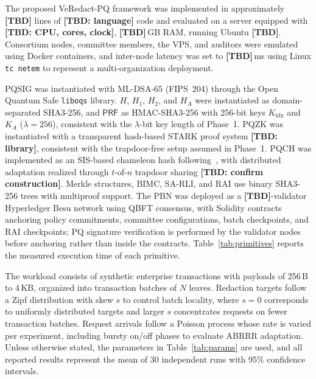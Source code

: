 \documentclass[lettersize,journal]{IEEEtran}
\begin{document}
    The proposed VeRedact-PQ framework was implemented in approximately
    \textbf{[TBD]} lines of \textbf{[TBD: language]} code and evaluated on a
    server equipped with \textbf{[TBD: CPU, cores, clock]},
    \textbf{[TBD]}\,GB RAM, running Ubuntu \textbf{[TBD]}. Consortium nodes,
    committee members, the VPS, and auditors were emulated using Docker
    containers, and inter-node latency was set to \textbf{[TBD]}\,ms using
    Linux \texttt{tc netem} to represent a multi-organization deployment.
    
    PQSIG was instantiated with ML-DSA-65 (FIPS~204) through the Open Quantum
    Safe \texttt{liboqs} library. $H$, $H_1$, $H_2$, and $H_A$ were
    instantiated as domain-separated SHA3-256, and $\mathsf{PRF}$ as
    HMAC-SHA3-256 with 256-bit keys $K_{\mathrm{idx}}$
    and $K_A$ { ($\lambda=256$)}, consistent with the {$\lambda$}-bit key length of Phase~1. PQZK was instantiated with a transparent hash-based
    STARK proof system \textbf{[TBD: library]}, consistent with the
    trapdoor-free setup assumed in Phase~1. PQCH was implemented as an
    SIS-based chameleon hash following~\cite{ref10,ref17}, with distributed
    adaptation realized through $t$-of-$n$ trapdoor sharing
    \textbf{[TBD: confirm construction]}. Merkle structures, BIMC, SA-RLI,
    and RAI use binary SHA3-256 trees with multiproof support. The PBN was
    deployed as a \textbf{[TBD]}-validator Hyperledger Besu network using
    QBFT consensus, with Solidity contracts anchoring policy commitments,
    committee configurations, batch checkpoints, and RAI checkpoints; PQ
    signature verification is performed by the validator nodes before
    anchoring rather than inside the contracts. Table~\ref{tab:primitives}
    reports the measured execution time of each primitive.
    
    The workload consists of synthetic enterprise transactions with payloads
    of 256\,B to 4\,KB, organized into transaction batches of $N$ leaves.
    Redaction targets follow a Zipf distribution with skew $s$ to control
    batch locality, where $s=0$ corresponds to uniformly distributed targets
    and larger $s$ concentrates requests on fewer transaction batches.
    Request arrivals follow a Poisson process whose rate is varied per
    experiment, including bursty on/off phases to evaluate ABRRR adaptation.
    Unless otherwise stated, the parameters in Table~\ref{tab:params} are
    used, and all reported results represent the mean of 30 independent runs
    with 95\% confidence intervals.
    
\end{document}
